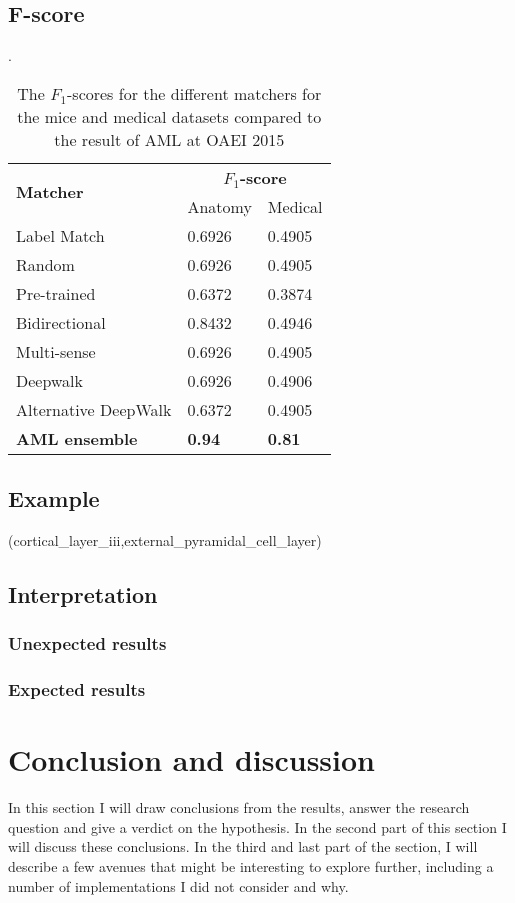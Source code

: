 \documentclass{article}
\begin{document}
  \subsection{F-score}
  \begin{table}[H]
  \caption[$F_1$]{The $F_1$-scores for the different matchers for the mice and medical datasets compared to the result of AML at OAEI 2015 \cite{oaei2015}}.
  \label{fscores}
  \begin{tabular}{l|ll}
  \multirow{2}{*}{\textbf{Matcher}} & \multicolumn{2}{c}{\textbf{$F_1$-score}} \\
  & Anatomy & Medical\\
  \hline
  Label Match & 0.6926 & 0.4905 \\
  Random & 0.6926 & 0.4905 \\
  Pre-trained & 0.6372 & 0.3874 \\
  Bidirectional & 0.8432 & 0.4946 \\
  Multi-sense & 0.6926 & 0.4905 \\
  Deepwalk & 0.6926 & 0.4906 \\
  Alternative DeepWalk & 0.6372 & 0.4905 \\
  \textbf{AML ensemble} & \textbf{0.94} & \textbf{0.81} \\
  \end{tabular}
  \end{table}
  
  \subsection{Example }
  (cortical\_layer\_iii,external\_pyramidal\_cell\_layer)
   
 \newpage
 \subsection{Interpretation}
 
 \subsubsection{Unexpected results}
 \subsubsection{Expected results}
  
 \newpage
 \section{Conclusion and discussion}
 In this section I will draw conclusions from the results, answer the research question and give a verdict on the hypothesis. In the second part of this section I will discuss these conclusions. In the third and last part of the section, I will describe a few avenues that might be interesting to explore further, including a number of implementations I did not consider and why.
 
\end{document}

